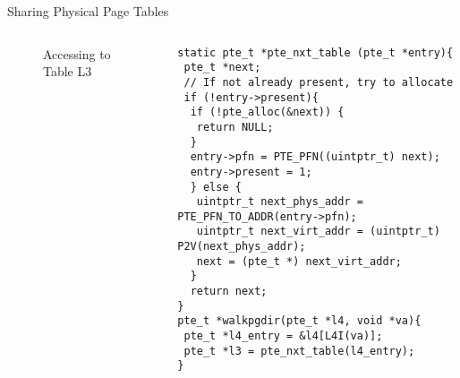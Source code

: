 \documentclass[aspectratio=169,xcolor=dvipsnames]{beamer}
\begin{document}
\begin{frame}[fragile]{Sharing Physical Page Tables}
\begin{columns}[c]
\begin{figure}
\begin{tikzpicture}[x=0.75pt,y=0.75pt,yscale=-0.5,xscale=0.5]
\end{tikzpicture}
        \caption{Accessing to Table L3}
        \label{fig:enter-label}
    \end{figure}
\begin{lstlisting}[style=CStyleNum, basicstyle=\tiny]
static pte_t *pte_nxt_table (pte_t *entry){
 pte_t *next;
 // If not already present, try to allocate
 if (!entry->present){
  if (!pte_alloc(&next)) {
   return NULL;
  }
  entry->pfn = PTE_PFN((uintptr_t) next);
  entry->present = 1;
  } else {
   uintptr_t next_phys_addr = PTE_PFN_TO_ADDR(entry->pfn);        
   uintptr_t next_virt_addr = (uintptr_t) P2V(next_phys_addr);
   next = (pte_t *) next_virt_addr;
  }
  return next;
}   
pte_t *walkpgdir(pte_t *l4, void *va){ 
 pte_t *l4_entry = &l4[L4I(va)];
 pte_t *l3 = pte_nxt_table(l4_entry);
}

\end{lstlisting}
\end{columns}
\end{frame}
\end{document}
